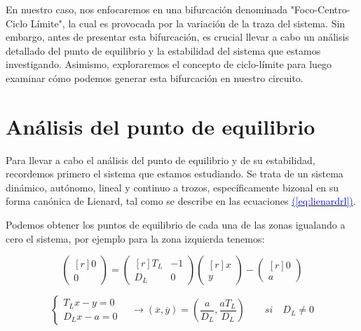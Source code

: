 \documentclass[12pt,a4paper]{report} %
\newcommand{\eref}[1]{\hyperref[#1]{\textcolor{blue}{(\ref*{#1})}}}
\newcommand{\eref}[1]{\hyperref[#1]{\textcolor{blue}{\textit{(\ref*{#1})}}}}
\begin{document}
	\vspace{0.5cm}\noindent En nuestro caso, nos enfocaremos en una bifurcación denominada "Foco-Centro-Ciclo Límite", la cual es provocada por la variación de la traza del sistema. Sin embargo, antes de presentar esta bifurcación, es crucial llevar a cabo un análisis detallado del punto de equilibrio y la estabilidad del sistema que estamos investigando. Asimismo, exploraremos el concepto de ciclo-límite para luego examinar cómo podemos generar esta bifurcación en nuestro circuito.
	
	\newpage
	
	\section{Análisis del punto de equilibrio}
	
		\vspace{0.5cm}Para llevar a cabo el análisis del punto de equilibrio y de su estabilidad, recordemos primero el sistema que estamos estudiando. Se trata de un sistema dinámico, autónomo, lineal y continuo a trozos, específicamente bizonal en su forma canónica de Lienard, tal como se describe en las ecuaciones \eref{eq:lienardrl}.
		
		\vspace{0.5cm}Podemos obtener los puntos de equilibrio de cada una de las zonas igualando a cero el sistema, por ejemplo para la zona izquierda tenemos:

		
		\begin{equation*}
			\begin{pmatrix*}[r]
				0\\ 0
			\end{pmatrix*}= \begin{pmatrix*}[r]
				T_L & -1 \\ D_L & 0
			\end{pmatrix*} \begin{pmatrix*}[r]
				x \\ y
			\end{pmatrix*}-\begin{pmatrix*}[r]
				0 \\ a
			\end{pmatrix*}
		\end{equation*}\smallskip
		
		\begin{equation}
			\label{eq:eqpointL}
			\left\{
			\begin{aligned}
				T_Lx-y=0\\
				D_Lx-a=0
			\end{aligned}
			\right. \quad \longrightarrow \left( \overline{x},\overline{y} \right)=\left( \frac{a}{D_L},\frac{aT_L}{D_L} \right) \qquad si \quad D_L\neq0
		\end{equation}\smallskip
		
\end{document}
